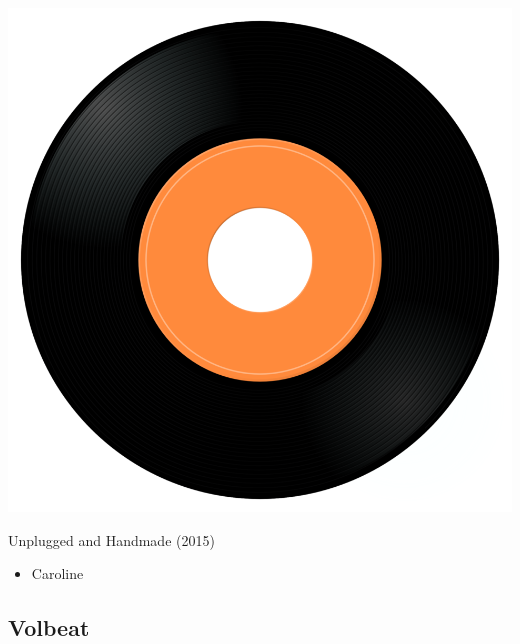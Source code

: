 \begin{minipage}[t]{0.25\textwidth}
\captionsetup{type=figure}
\includegraphics[width=\textwidth]{Images/cover.png}
\caption*{Unplugged and Handmade (2015)}
\end{minipage}
\begin{minipage}[t]{0.25\textwidth}\vspace{0pt}
\begin{itemize}[nosep,leftmargin=1em,labelwidth=*,align=left]
	\setlength{\itemsep}{0pt}
	\item Caroline
\end{itemize}
\end{minipage}

\subsection{Volbeat}


